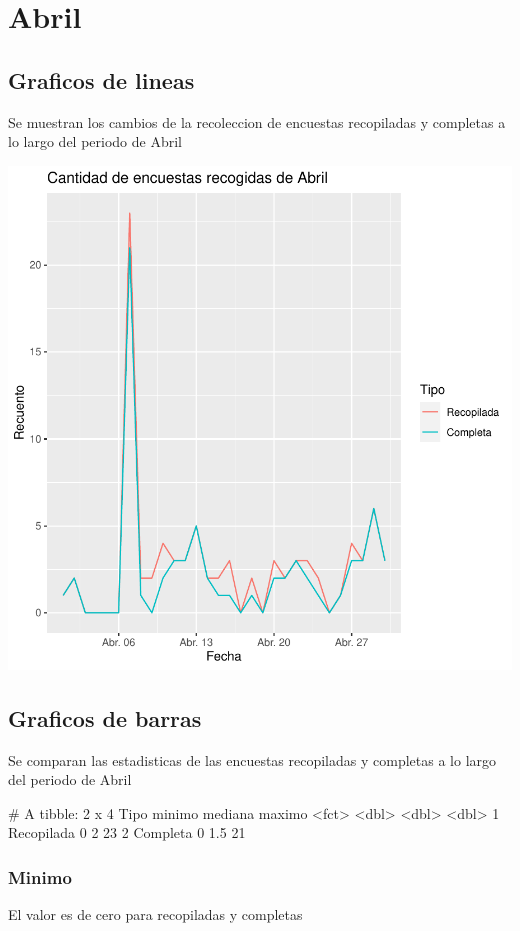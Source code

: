 \documentclass{article}
\begin{document}
\section{Abril}
\subsection{Graficos de lineas}
Se muestran los cambios de la recoleccion de encuestas recopiladas y completas a lo largo del periodo de Abril

\includegraphics{seguimento2-066}

\subsection{Graficos de barras}
Se comparan las estadisticas de las encuestas recopiladas y completas a lo largo del periodo de Abril

\begin{Schunk}
\begin{Soutput}
# A tibble: 2 x 4
  Tipo       minimo mediana maximo
  <fct>       <dbl>   <dbl>  <dbl>
1 Recopilada      0     2       23
2 Completa        0     1.5     21
\end{Soutput}
\end{Schunk}

\subsubsection{Minimo}
El valor es de cero para recopiladas y completas
\end{document}
